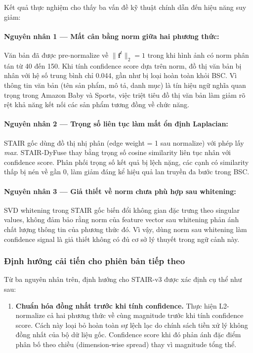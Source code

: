 \begin{longtable}
Kết quả thực nghiệm cho thấy ba vấn đề kỹ thuật chính dẫn đến hiệu năng suy giảm:
 
\paragraph{Nguyên nhân 1 — Mất cân bằng norm giữa hai phương thức:}
Văn bản đã được pre-normalize về $\|\mathbf{f}^t\|_2 = 1$ trong khi hình ảnh có norm phân tán từ 40 đến 150. Khi tính confidence score dựa trên norm, đồ thị văn bản bị nhân với hệ số trung bình chỉ 0.044, gần như bị loại hoàn toàn khỏi BSC. Vì thông tin văn bản (tên sản phẩm, mô tả, danh mục) là tín hiệu ngữ nghĩa quan trọng trong Amazon Baby và Sports, việc triệt tiêu đồ thị văn bản làm giảm rõ rệt khả năng kết nối các sản phẩm tương đồng về chức năng.
 
\paragraph{Nguyên nhân 2 — Trọng số liên tục làm mất ổn định Laplacian:}
STAIR gốc dùng đồ thị nhị phân (edge weight = 1 sau normalize) với phép lấy \textit{max}. STAIR-DyFuse thay bằng trọng số cosine similarity liên tục nhân với confidence score. Phân phối trọng số kết quả bị lệch nặng, các cạnh có similarity thấp bị nén về gần 0, làm giảm đáng kể hiệu quả lan truyền đa bước trong BSC.
 
\paragraph{Nguyên nhân 3 — Giả thiết về norm chưa phù hợp sau whitening:}
SVD whitening trong STAIR gốc biến đổi không gian đặc trưng theo singular values, không đảm bảo rằng norm của feature vector sau whitening phản ánh chất lượng thông tin của phương thức đó. Vì vậy, dùng norm sau whitening làm confidence signal là giả thiết không có đủ cơ sở lý thuyết trong ngữ cảnh này.
 
\subsubsection{Định hướng cải tiến cho phiên bản tiếp theo}
 
Từ ba nguyên nhân trên, định hướng cho STAIR-v3 được xác định cụ thể như sau:
 
\begin{enumerate}[leftmargin=*, label=\textbf{\arabic*.}]
    \item \textbf{Chuẩn hóa đồng nhất trước khi tính confidence.} Thực hiện L2-normalize cả hai phương thức về cùng magnitude trước khi tính confidence score. Cách này loại bỏ hoàn toàn sự lệch lạc do chính sách tiền xử lý không đồng nhất của bộ dữ liệu gốc. Confidence score khi đó phản ánh đặc điểm phân bố theo chiều (dimension-wise spread) thay vì magnitude tổng thể.
 

\end{enumerate}
\end{longtable}
